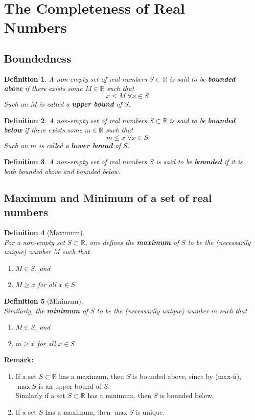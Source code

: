 \documentclass[12pt]{article}
\newtheorem{definition}{Definition}[section]
\theoremstyle{definition}
\begin{document}
\section{The Completeness of Real Numbers}
\subsection{Boundedness}
\begin{definition}\normalfont A non-empty set of real numbers $S\subset\mathbb{R}$ is said to be \textbf{bounded above} if there exists some $M\in\mathbb{R}$ such that
\[
x\leq M\;\forall x\in S
\]
Such an $M$ is called a \textbf{upper bound} of $S$.
\end{definition} 
\begin{definition}\normalfont A non-empty set of real numbers $S\subset\mathbb{R}$ is said to be \textbf{bounded below} if there exists some $m\in\mathbb{R}$ such that
\[
m\leq x\;\forall x\in S
\]
Such an $m$ is called a \textbf{lower bound} of $S$.
\end{definition}
\begin{definition}\normalfont A non-empty set of real numbers $S$ is said to be \textbf{bounded} if it is both bounded above and bounded below.
\end{definition}
\subsection{Maximum and Minimum of a set of real numbers}
\begin{definition}[Maximum]
\hfill\\\normalfont For a non-empty set $S\subset \mathbb{R}$, one defines the \textbf{maximum} of $S$ to be the (necessarily unique) number $M$ such that
\begin{enumerate}[label = max-\roman*]
\item $M\in S$, and 
\item $M\geq x$ for all $x\in S$
\end{enumerate}
\end{definition}
\begin{definition}[Minimum]
\hfill\\\normalfont Similarly, the \textbf{minimum} of $S$ to be the (necessarily unique) number $m$ such that
\begin{enumerate}[label = min-\roman*]
\item $M\in S$, and 
\item $m\geq x$ for all $x\in S$
\end{enumerate}
\end{definition}
\textbf{Remark:}
\begin{enumerate}
\item If a set $S\subset\mathbb{R}$ has a maximum, then $S$ is bounded above, since by (max-ii), $\max S$ is an upper bound of $S$.\\Similarly if a set $S\subset\mathbb{R}$ has a minimum, then $S$ is bounded below.
\item If a set $S$ has a maximum, then $\max S$ is unique.
\end{enumerate}
\end{document}

